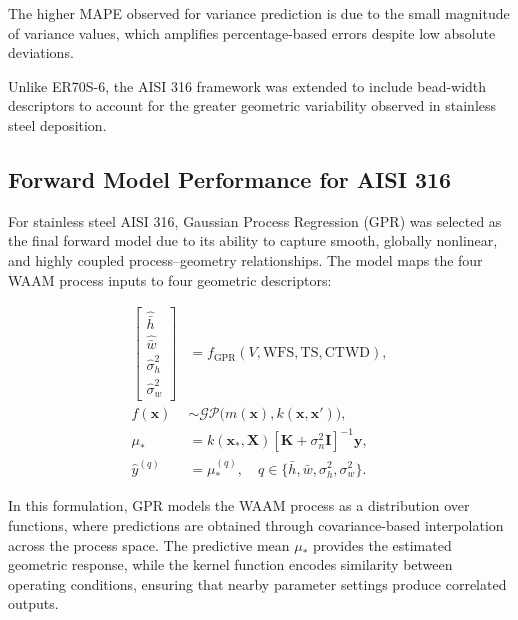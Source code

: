 \documentclass[11pt]{article}
\begin{document}
The higher MAPE observed for variance prediction is due to the small magnitude of variance values, which amplifies percentage-based errors despite low absolute deviations.

Unlike ER70S-6, the AISI 316 framework was extended to include bead-width descriptors to account for the greater geometric variability observed in stainless steel deposition.

\subsection{Forward Model Performance for AISI 316}

For stainless steel AISI 316, Gaussian Process Regression (GPR) was selected as the final forward model due to its ability to capture smooth, globally nonlinear, and highly coupled process--geometry relationships. The model maps the four WAAM process inputs to four geometric descriptors:

\begin{tcolorbox}[colback=white,colframe=black,boxrule=0.5pt,arc=2pt]
\begin{equation}
\begin{aligned}
\begin{bmatrix}
\hat{\bar{h}} \\
\hat{\bar{w}} \\
\hat{\sigma}_h^2 \\
\hat{\sigma}_w^2
\end{bmatrix}
&=
f_{\mathrm{GPR}}(V,\mathrm{WFS},\mathrm{TS},\mathrm{CTWD}), \\
f(\mathbf{x}) &\sim \mathcal{GP}\big(m(\mathbf{x}), k(\mathbf{x},\mathbf{x}')\big), \\
\mu_{*} &= k(\mathbf{x}_{*},\mathbf{X})
\left[\mathbf{K} + \sigma_n^2\mathbf{I}\right]^{-1}\mathbf{y}, \\
\hat{y}^{(q)} &= \mu_{*}^{(q)}, \quad
q \in \{\bar{h}, \bar{w}, \sigma_h^2, \sigma_w^2\}.
\end{aligned}
\end{equation}
\end{tcolorbox}

In this formulation, GPR models the WAAM process as a distribution over functions, where predictions are obtained through covariance-based interpolation across the process space. The predictive mean $\mu_{*}$ provides the estimated geometric response, while the kernel function encodes similarity between operating conditions, ensuring that nearby parameter settings produce correlated outputs.
\end{document}

